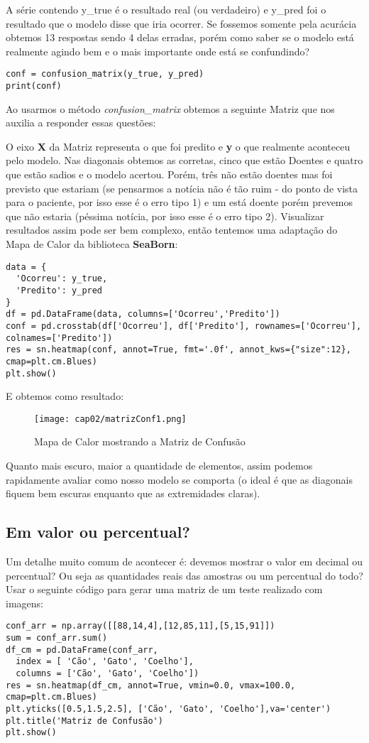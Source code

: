 A série contendo y\_true é o resultado real (ou verdadeiro) e y\_pred foi o resultado que o modelo disse que iria ocorrer. Se fossemos somente pela acurácia obtemos 13 respostas sendo 4 delas erradas, porém como saber se o modelo está realmente agindo bem e o mais importante onde está se confundindo?
\begin{lstlisting}
conf = confusion_matrix(y_true, y_pred)
print(conf)
\end{lstlisting}

Ao usarmos o método \textit{confusion\_matrix} obtemos a seguinte Matriz que nos auxilia a responder essas questões: \\
\codigo{$[[$5 1$][$3 4$]]$}

O eixo \textbf{X} da Matriz representa o que foi predito e \textbf{y} o que realmente aconteceu pelo modelo. Nas diagonais obtemos as corretas, cinco que estão Doentes e quatro que estão sadios e o modelo acertou. Porém, três não estão doentes mas foi previsto que estariam (se pensarmos a notícia não é tão ruim - do ponto de vista para o paciente, por isso esse é o erro tipo 1) e um está doente porém prevemos que não estaria (péssima notícia, por isso esse é o erro tipo 2). Visualizar resultados assim pode ser bem complexo, então tentemos uma adaptação do Mapa de Calor da biblioteca \textbf{SeaBorn}:
\begin{lstlisting}
data = {
  'Ocorreu': y_true,
  'Predito': y_pred
}
df = pd.DataFrame(data, columns=['Ocorreu','Predito'])
conf = pd.crosstab(df['Ocorreu'], df['Predito'], rownames=['Ocorreu'], colnames=['Predito'])
res = sn.heatmap(conf, annot=True, fmt='.0f', annot_kws={"size":12}, cmap=plt.cm.Blues)
plt.show()
\end{lstlisting}

E obtemos como resultado:
\begin{figure}[H]
	\centering
	\texttt{[image: cap02/matrizConf1.png]}
	\caption{Mapa de Calor mostrando a Matriz de Confusão}
\end{figure}

Quanto mais escuro, maior a quantidade de elementos, assim podemos rapidamente avaliar como nosso modelo se comporta (o ideal é que as diagonais fiquem bem escuras enquanto que as extremidades claras).

\subsection{Em valor ou percentual?}
Um detalhe muito comum de acontecer é: devemos mostrar o valor em decimal ou percentual? Ou seja as quantidades reais das amostras ou um percentual do todo? Usar o seguinte código para gerar uma matriz de um teste realizado com imagens:
\begin{lstlisting}
conf_arr = np.array([[88,14,4],[12,85,11],[5,15,91]])
sum = conf_arr.sum()
df_cm = pd.DataFrame(conf_arr,
  index = [ 'Cão', 'Gato', 'Coelho'],
  columns = ['Cão', 'Gato', 'Coelho'])
res = sn.heatmap(df_cm, annot=True, vmin=0.0, vmax=100.0, cmap=plt.cm.Blues)
plt.yticks([0.5,1.5,2.5], ['Cão', 'Gato', 'Coelho'],va='center')
plt.title('Matriz de Confusão')
plt.show()
\end{lstlisting}

